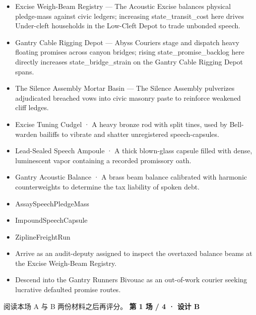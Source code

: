 \documentclass[10pt,a4paper]{article}
\newcommand{\heading}[1]{\par\vspace{5pt}{\color{teal}\bfseries #1}\par}
\begin{document}
\begin{minipage}[t]{0.48\linewidth}\fontsize{9}{12}\selectfont\raggedright\setlength{\parskip}{0pt}
\heading{地点与用途}\begin{itemize}
\item Excise Weigh-Beam Registry — The Acoustic Excise balances physical pledge-mass against civic ledgers; increasing state\_transit\_cost here drives Under-cleft households in the Low-Cleft Depot to trade unbonded speech.
\item Gantry Cable Rigging Depot — Abyss Couriers stage and dispatch heavy floating promises across canyon bridges; rising state\_promise\_backlog here directly increases state\_bridge\_strain on the Gantry Cable Rigging Depot spans.
\item The Silence Assembly Mortar Basin — The Silence Assembly pulverizes adjudicated breached vows into civic masonry paste to reinforce weakened cliff ledges.
\end{itemize}
\heading{物件}\begin{itemize}
\item Excise Tuning Cudgel · A heavy bronze rod with split tines, used by Bell-warden bailiffs to vibrate and shatter unregistered speech-capsules.
\item Lead-Sealed Speech Ampoule · A thick blown-glass capsule filled with dense, luminescent vapor containing a recorded promissory oath.
\item Gantry Acoustic Balance · A brass beam balance calibrated with harmonic counterweights to determine the tax liability of spoken debt.
\end{itemize}
\heading{可能采取的行动}\begin{itemize}
\item AssaySpeechPledgeMass
\item ImpoundSpeechCapsule
\item ZiplineFreightRun
\end{itemize}
\heading{玩家进入方式}\begin{itemize}
\item Arrive as an audit-deputy assigned to inspect the overtaxed balance beams at the Excise Weigh-Beam Registry.
\item Descend into the Gantry Runners Bivouac as an out-of-work courier seeking lucrative defaulted promise routes.
\end{itemize}
\end{minipage}
\vfill\small 阅读本场 A 与 B 两份材料之后再评分。
\clearpage
{\Large\bfseries 第 1 场 / 4 · 设计 B}\par
\end{document}
